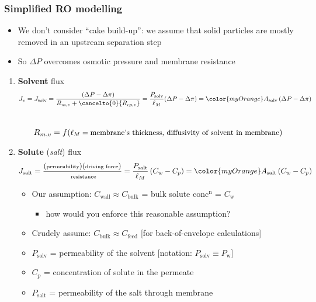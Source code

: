 \begin{frame}\frametitle{Simplified RO modelling}
	\begin{itemize}
		\item	We don't consider ``cake build-up'': we assume that solid particles are mostly removed in an upstream separation step
		\item	So $\Delta P$ overcomes osmotic pressure and membrane resistance
	\end{itemize}
	\vspace{-6pt}
	\begin{enumerate}
		\item	\textbf{Solvent} flux
			\[	J_v = J_\text{solv} = \frac{(\Delta P - \Delta \pi)}{R_{m,v} + \cancelto{0}{R_{cp,v}}} = \frac{P_\text{solv}}{\ell_M}(\Delta P - \Delta \pi) = {\color{myOrange}A_\text{solv}\left(\Delta P - \Delta \pi\right)} \] \\
			\[	R_{m,v} = f(\text{\small $\ell_M=\text{membrane's thickness}$, diffusivity of solvent in membrane})\]
		\item	\textbf{Solute} (\emph{salt}) flux
			\[
				J_\text{salt} = {\scriptsize \dfrac{(\text{permeability})(\text{driving force})}{\text{ resistance}} }= \dfrac{P_\text{salt}}{\ell_M} \left(C_w - C_p\right) = {\color{myOrange}A_\text{salt} \left(C_w - C_p\right)}
			\]
			\begin{itemize}
				\item	Our assumption: $C_\text{wall} \approx C_\text{bulk}$ = bulk solute conc$^\text{n}$ = {\color{myOrange}$C_\text{w}$}
				\begin{itemize}
					\item	how would you enforce this reasonable assumption?  %
				\end{itemize}
				\item	Crudely assume: $C_\text{bulk}  \approx C_\text{feed}$ {\scriptsize [for back-of-envelope calculations]}
				\item	$P_\text{solv}$ = permeability of the solvent [notation: $P_\text{solv} \equiv P_\text{w}$]
				\item	$C_p$ = concentration of solute in the permeate
				\item	$P_\text{salt}$ = permeability of the salt through membrane
			\end{itemize}
	\end{enumerate}
\end{frame}

